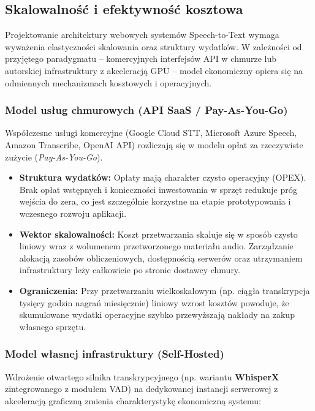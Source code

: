 \subsection{Skalowalność i efektywność kosztowa}
\label{subsec:cost_scalability}

Projektowanie architektury webowych systemów Speech-to-Text wymaga wyważenia elastyczności skalowania oraz struktury wydatków. W zależności od przyjętego paradygmatu – komercyjnych interfejsów API w chmurze lub autorskiej infrastruktury z akceleracją GPU – model ekonomiczny opiera się na odmiennych mechanizmach kosztowych i operacyjnych.

\subsubsection{Model usług chmurowych (API SaaS / Pay-As-You-Go)}

Współczesne usługi komercyjne (Google Cloud STT, Microsoft Azure Speech, Amazon Transcribe, OpenAI API) rozliczają się w modelu opłat za rzeczywiste zużycie (\textit{Pay-As-You-Go}). 

\begin{itemize}
    \item \textbf{Struktura wydatków:} Opłaty mają charakter czysto operacyjny (OPEX). Brak opłat wstępnych i konieczności inwestowania w sprzęt redukuje próg wejścia do zera, co jest szczególnie korzystne na etapie prototypowania i wczesnego rozwoju aplikacji.
    \item \textbf{Wektor skalowalności:} Koszt przetwarzania skaluje się w sposób czysto liniowy wraz z wolumenem przetworzonego materiału audio. Zarządzanie alokacją zasobów obliczeniowych, dostępnością serwerów oraz utrzymaniem infrastruktury leży całkowicie po stronie dostawcy chmury.
    \item \textbf{Ograniczenia:} Przy przetwarzaniu wielkoskalowym (np. ciągła transkrypcja tysięcy godzin nagrań miesięcznie) liniowy wzrost kosztów powoduje, że skumulowane wydatki operacyjne szybko przewyższają nakłady na zakup własnego sprzętu.
\end{itemize}

\subsubsection{Model własnej infrastruktury (Self-Hosted)}

Wdrożenie otwartego silnika transkrypcyjnego (np. wariantu \textbf{WhisperX} zintegrowanego z modułem VAD) na dedykowanej instancji serwerowej z akceleracją graficzną zmienia charakterystykę ekonomiczną systemu:

